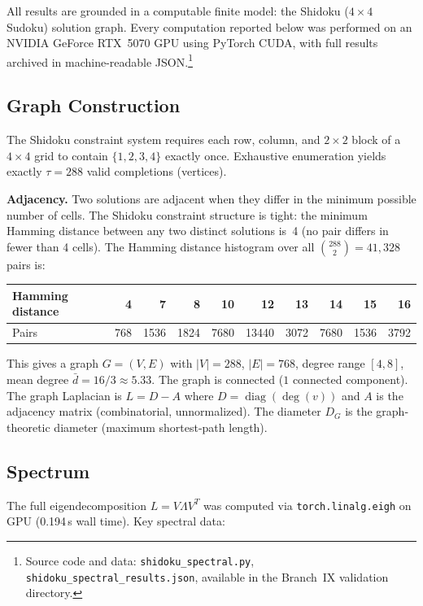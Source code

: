 \documentclass[11pt]{article}
\theoremstyle{definition}
\theoremstyle{remark}
\begin{document}
All results are grounded in a computable finite model: the Shidoku ($4 \times 4$ Sudoku) solution graph. Every computation reported below was performed on an NVIDIA GeForce RTX~5070 GPU using PyTorch CUDA, with full results archived in machine-readable JSON.\footnote{Source code and data: \texttt{shidoku\_spectral.py}, \texttt{shidoku\_spectral\_results.json}, available in the Branch~IX validation directory.}

\subsection{Graph Construction}

The Shidoku constraint system requires each row, column, and $2 \times 2$ block of a $4 \times 4$ grid to contain $\{1,2,3,4\}$ exactly once. Exhaustive enumeration yields exactly $\tau = 288$ valid completions (vertices).

\textbf{Adjacency.} Two solutions are adjacent when they differ in the minimum possible number of cells. The Shidoku constraint structure is tight: the minimum Hamming distance between any two distinct solutions is~4 (no pair differs in fewer than 4 cells). The Hamming distance histogram over all $\binom{288}{2} = 41{,}328$ pairs is:

\begin{center}
\begin{tabular}{l*{9}{r}}
\toprule
Hamming distance & 4 & 7 & 8 & 10 & 12 & 13 & 14 & 15 & 16 \\
\midrule
Pairs & 768 & 1536 & 1824 & 7680 & 13440 & 3072 & 7680 & 1536 & 3792 \\
\bottomrule
\end{tabular}
\end{center}

This gives a graph $G = (V, E)$ with $|V| = 288$, $|E| = 768$, degree range $[4, 8]$, mean degree $\bar{d} = 16/3 \approx 5.33$. The graph is connected ($1$ connected component). The graph Laplacian is $L = D - A$ where $D = \operatorname{diag}(\deg(v))$ and $A$ is the adjacency matrix (combinatorial, unnormalized). The diameter $D_G$ is the graph-theoretic diameter (maximum shortest-path length).


\subsection{Spectrum}

The full eigendecomposition $L = V \Lambda V^T$ was computed via \texttt{torch.linalg.eigh} on GPU (0.194\,s wall time). Key spectral data:
\end{document}
